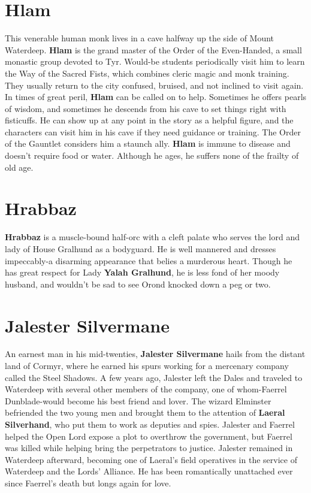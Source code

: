 \documentclass[10pt,a4paper,twoside,twocolumn,openany,nodeprecatedcode]{dndbook}
\begin{document}
\section{Hlam}
This venerable human monk lives in a cave halfway up the side of Mount Waterdeep. \textbf{Hlam} is the grand master of the Order of the Even-Handed, a small monastic group devoted to Tyr. Would-be students periodically visit him to learn the Way of the Sacred Fists, which combines cleric magic and monk training. They usually return to the city confused, bruised, and not inclined to visit again.
In times of great peril, \textbf{Hlam} can be called on to help. Sometimes he offers pearls of wisdom, and sometimes he descends from his cave to set things right with fisticuffs. He can show up at any point in the story as a helpful figure, and the characters can visit him in his cave if they need guidance or training. The Order of the Gauntlet considers him a staunch ally.
\textbf{Hlam} is immune to disease and doesn't require food or water. Although he ages, he suffers none of the frailty of old age.
\section{Hrabbaz}
\textbf{Hrabbaz} is a muscle-bound half-orc with a cleft palate who serves the lord and lady of House Gralhund as a bodyguard. He is well mannered and dresses impeccably-a disarming appearance that belies a murderous heart. Though he has great respect for Lady \textbf{Yalah Gralhund}, he is less fond of her moody husband, and wouldn't be sad to see Orond knocked down a peg or two.
\section{Jalester Silvermane}
An earnest man in his mid-twenties, \textbf{Jalester Silvermane} hails from the distant land of Cormyr, where he earned his spurs working for a mercenary company called the Steel Shadows. A few years ago, Jalester left the Dales and traveled to Waterdeep with several other members of the company, one of whom-Faerrel Dunblade-would become his best friend and lover.
The wizard Elminster befriended the two young men and brought them to the attention of \textbf{Laeral Silverhand}, who put them to work as deputies and spies. Jalester and Faerrel helped the Open Lord expose a plot to overthrow the government, but Faerrel was killed while helping bring the perpetrators to justice. Jalester remained in Waterdeep afterward, becoming one of Laeral's field operatives in the service of Waterdeep and the Lords' Alliance. He has been romantically unattached ever since Faerrel's death but longs again for love.
\end{document}
